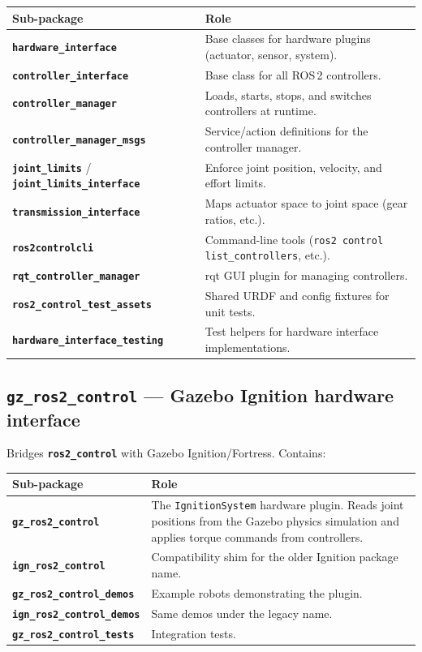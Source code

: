 \documentclass[11pt,a4paper]{article}
\newcommand{\pkg}[1]{\texttt{\textbf{#1}}}
\begin{document}
\begin{center}
\begin{tabular}{|l|p{9cm}|}
\hline
\textbf{Sub-package} & \textbf{Role} \\
\hline
\pkg{hardware\_interface} & Base classes for hardware plugins (actuator, sensor, system). \\
\hline
\pkg{controller\_interface} & Base class for all ROS\,2 controllers. \\
\hline
\pkg{controller\_manager} & Loads, starts, stops, and switches controllers at runtime. \\
\hline
\pkg{controller\_manager\_msgs} & Service/action definitions for the controller manager. \\
\hline
\pkg{joint\_limits} / \pkg{joint\_limits\_interface} &
  Enforce joint position, velocity, and effort limits. \\
\hline
\pkg{transmission\_interface} & Maps actuator space to joint space (gear ratios, etc.). \\
\hline
\pkg{ros2controlcli} & Command-line tools (\texttt{ros2 control list\_controllers}, etc.). \\
\hline
\pkg{rqt\_controller\_manager} & rqt GUI plugin for managing controllers. \\
\hline
\pkg{ros2\_control\_test\_assets} & Shared URDF and config fixtures for unit tests. \\
\hline
\pkg{hardware\_interface\_testing} & Test helpers for hardware interface implementations. \\
\hline
\end{tabular}
\end{center}

\subsection{\texttt{gz\_ros2\_control} --- Gazebo Ignition hardware interface}

Bridges \pkg{ros2\_control} with Gazebo Ignition/Fortress. Contains:

\begin{center}
\begin{tabular}{|l|p{9cm}|}
\hline
\textbf{Sub-package} & \textbf{Role} \\
\hline
\pkg{gz\_ros2\_control} &
  The \texttt{IgnitionSystem} hardware plugin. Reads joint positions from
  the Gazebo physics simulation and applies torque commands from controllers. \\
\hline
\pkg{ign\_ros2\_control} & Compatibility shim for the older Ignition package name. \\
\hline
\pkg{gz\_ros2\_control\_demos} & Example robots demonstrating the plugin. \\
\hline
\pkg{ign\_ros2\_control\_demos} & Same demos under the legacy name. \\
\hline
\pkg{gz\_ros2\_control\_tests} & Integration tests. \\
\hline
\end{tabular}
\end{center}
\end{document}
